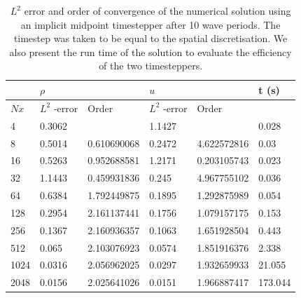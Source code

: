 \documentclass[a4paper,11pt]{article}
\begin{document}
\begin{table}[]
\centering
\caption{$L^2$ error and order of convergence of the numerical solution using an implicit midpoint timestepper after 10 wave periods. The timestep was taken to be equal to the spatial discretisation. We also present the run time of the solution to evaluate the efficiency of the two timesteppers. }
\label{midpointerror}
\begin{tabular}{@{}llllll@{}}
\toprule
     & \multicolumn{2}{l}{$\rho$} & \multicolumn{2}{l}{$u$}    & t (s)   \\ \midrule
   
$Nx$ & $L^2$ -error & Order       & $L^2$ -error & Order       &         \\
  \toprule
4    & 0.3062       &             & 1.1427       &             & 0.028   \\
8    & 0.5014       & 0.610690068 & 0.2472       & 4.622572816 & 0.03    \\
16   & 0.5263       & 0.952688581 & 1.2171       & 0.203105743 & 0.023   \\
32   & 1.1443       & 0.459931836 & 0.245        & 4.967755102 & 0.036   \\
64   & 0.6384       & 1.792449875 & 0.1895       & 1.292875989 & 0.054   \\
128  & 0.2954       & 2.161137441 & 0.1756       & 1.079157175 & 0.153   \\
256  & 0.1367       & 2.160936357 & 0.1063       & 1.651928504 & 0.443   \\
512  & 0.065        & 2.103076923 & 0.0574       & 1.851916376 & 2.338   \\
1024 & 0.0316       & 2.056962025 & 0.0297       & 1.932659933 & 21.055  \\
2048 & 0.0156       & 2.025641026 & 0.0151       & 1.966887417 & 173.044 \\ \bottomrule
\end{tabular}
\end{table}
\end{document}
